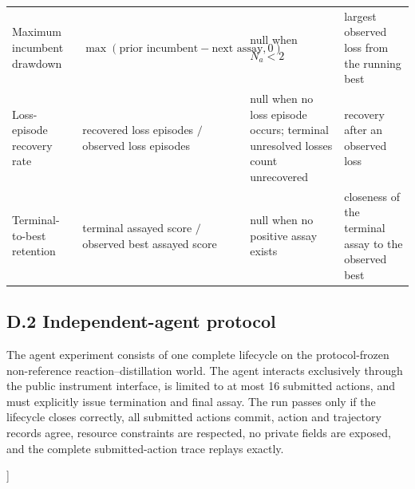 \documentclass[10pt,twocolumn]{article}
\begin{document}
\begin{@twocolumnfalse}
\begin{tabularx}{\textwidth}{@{}L{0.16\textwidth}L{0.24\textwidth}L{0.20\textwidth}Y@{}}
Maximum incumbent drawdown & $\max(\text{prior incumbent}-\text{next assay},0)$ & null when $N_a<2$ & largest observed loss from the running best \\
Loss-episode recovery rate & recovered loss episodes $/$ observed loss episodes & null when no loss episode occurs; terminal unresolved losses count unrecovered & recovery after an observed loss \\
Terminal-to-best retention & terminal assayed score $/$ observed best assayed score & null when no positive assay exists & closeness of the terminal assay to the observed best \\
\bottomrule
\end{tabularx}
\par\medskip
\raggedright
\normalsize
\subsection{D.2 Independent-agent protocol}\label{appendix-d.2-independent-agent-protocol}
\noindent The agent experiment consists of one complete lifecycle on the protocol-frozen
non-reference reaction--distillation world. The agent interacts exclusively through the
public instrument interface, is limited to at most 16 submitted actions, and must explicitly
issue termination and final assay. The run passes only if the lifecycle closes correctly,
all submitted actions commit, action and trajectory records agree, resource constraints are
respected, no private fields are exposed, and the complete submitted-action trace replays
exactly.
\end{@twocolumnfalse}
]

\balance
\end{document}
